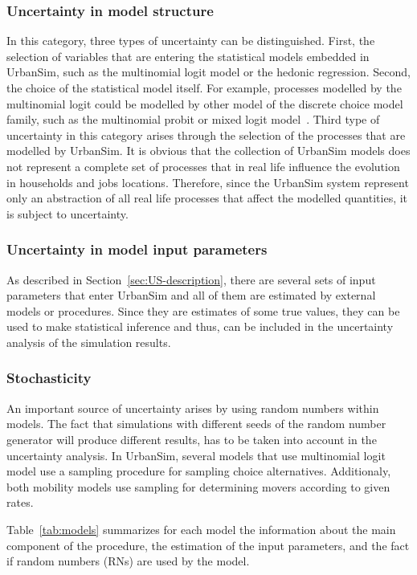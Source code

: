 \documentclass[11pt, fleqn]{article}
\begin{document}
\subsubsection{Uncertainty in model structure}
%
In this category, three types of uncertainty can be distinguished. First, the
selection of variables that are entering the statistical models embedded in
UrbanSim, such as the multinomial logit model or the hedonic regression.
Second, the choice of the statistical model itself. For example, processes
modelled by the multinomial logit could be modelled by other model of the
discrete choice model family, such as the multinomial probit or mixed logit
model~\citep{train03}. Third type of uncertainty in this category arises
through the selection of the processes that are modelled by UrbanSim. It is
obvious that the collection of UrbanSim models does not represent a complete
set of processes that in real life influence the evolution in households and
jobs locations.  Therefore, since the UrbanSim system represent only an
abstraction of all real life processes that affect the modelled quantities, it
is subject to uncertainty.

\subsubsection{Uncertainty in model input parameters}
%
As described in Section~\ref{sec:US-description}, there are several sets of
input parameters that enter UrbanSim and all of them are estimated by external
models or procedures. Since they are estimates of some true values, they can
be used to make statistical inference and thus, can be included in the
uncertainty analysis of the simulation results.  

\subsubsection{Stochasticity}
%
An important source of uncertainty arises by using random numbers within
models. The fact that simulations with different seeds of the random number
generator will produce different results, has to be taken into account in the
uncertainty analysis. In UrbanSim, several models that use multinomial logit
model use a sampling procedure for sampling choice alternatives. Additionaly,
both mobility models use sampling for determining movers according to given
rates. 

Table~\ref{tab:models} summarizes for each model the information about the
main component of the procedure, the estimation of the input parameters, and
the fact if random numbers (RNs) are used by the model.
\end{document}
